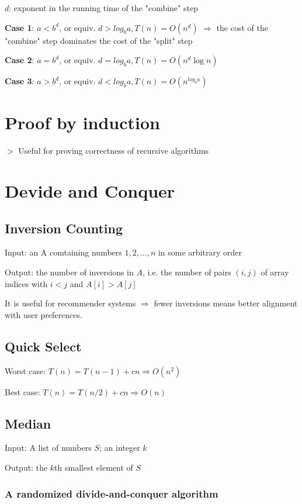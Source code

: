 \documentclass[12pt,a4paper]{article}
\newcommand{\remark}[1]{
    {\small $>$ {\color{blue} #1}}
}
\begin{document}
$d$: exponent in the running time of the "combine" step

\textbf{Case 1}: $a < b^d$, or equiv. $d > log_ba, T(n) = O(n^d)$
$\Rightarrow$ the cost of the "combine" step dominates the cost of the "split" step

\textbf{Case 2}: $a = b^d$, or equiv. $d = log_ba, T(n) = O(n^d \log n)$

\textbf{Case 3}: $a > b^d$, or equiv. $d < log_ba, T(n) = O(n^{log_ba})$

\section*{Proof by induction}

\remark{Useful for proving correctness of recursive algorithms}

\section*{Devide and Conquer}

\subsection*{Inversion Counting}

Input: an A comtaining numbers $1,2,\dots,n$ in some arbitrary order

Output: the number of inversions in $A$, i.e. the number of pairs $(i,j)$ of array indices with $i < j$ and $A[i] > A[j]$

It is useful for recommender systems $\Rightarrow$ fewer inversions means better alignment with user preferences.



\subsection*{Quick Select}

Worst case: $ T(n) = T(n-1) + cn \Rightarrow O(n^2)$

Best case: $ T(n) = T(n/2) + cn \Rightarrow O(n)$

\subsection*{Median}

Input: A list of numbers $S$; an integer $k$

Output: the $k$th smallest element of $S$

\subsubsection{A randomized divide-and-conquer algorithm}
\end{document}
